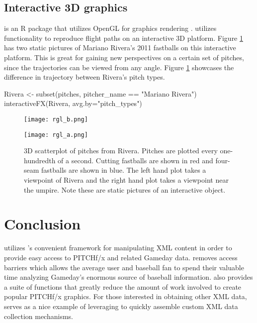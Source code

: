 \begin{article}
\subsection{Interactive 3D graphics}

 is an R package that utilizes OpenGL for graphics rendering
\citet{rgl}.  utilizes  functionality
to reproduce flight paths on an interactive 3D platform. Figure \ref{fig:rgl}
has two static pictures of Mariano Rivera's 2011 fastballs on this
interactive platform. This is great for gaining new perspectives on
a certain set of pitches, since the trajectories can be viewed from
any angle. Figure \ref{fig:rgl} showcases the difference in trajectory
between Rivera's pitch types.

\begin{Schunk}
\begin{Sinput}
Rivera <- subset(pitches, pitcher_name == "Mariano Rivera")
interactiveFX(Rivera, avg.by="pitch_types")
\end{Sinput}
\end{Schunk}


\begin{figure}[h]
\begin{minipage}[t]{0.45\textwidth}%
\centerline{\texttt{[image: rgl\_b.png]}}%
\end{minipage}\hspace*{\fill}%
\begin{minipage}[t]{0.45\textwidth}%
\centerline{\texttt{[image: rgl\_a.png]}}%
\end{minipage}

\caption{3D scatterplot of pitches from Rivera. Pitches are plotted every one-hundredth
of a second. Cutting fastballs are shown in red and four-seam fastballs
are shown in blue. The left hand plot takes a viewpoint of Rivera
and the right hand plot takes a viewpoint near the umpire. Note these
are static pictures of an interactive object. \label{fig:rgl}}
\end{figure}



\section{Conclusion}

 utilizes 's convenient framework for manipulating
XML content in order to provide easy access to PITCHf/x and related
Gameday data.  removes access barriers which allows
the average  user and baseball fan to spend their valuable
time analyzing Gameday's enormous source of baseball information.
 also provides a suite of functions that greatly reduce
the amount of work involved to create popular PITCHf/x graphics. For
those interested in obtaining other XML data,  serves
as a nice example of leveraging  to quickly assemble custom
XML data collection mechanisms.



\end{article}

